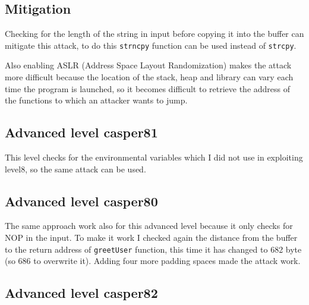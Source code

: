 \documentclass[a4paper,12pt]{article}
\begin{document}

\subsection{Mitigation}

Checking for the length of the string in input before copying it into the buffer can mitigate this attack, to do this \texttt{strncpy} function can be used instead of \texttt{strcpy}.

Also enabling ASLR (Address Space Layout Randomization) makes the attack more difficult because the location of the stack, heap and library can vary each time the program is launched, so it becomes difficult to retrieve the address of the functions to which an attacker wants to jump.

\subsection{Advanced level casper81}

This level checks for the environmental variables which I did not use in exploiting level8, so the same attack can be used.

\subsection{Advanced level casper80}

The same approach work also for this advanced level because it only checks for NOP in the input. To make it work I checked again the distance from the buffer to the return address of \texttt{greetUser} function, this time it has changed to 682 byte (so 686 to overwrite it). Adding four more padding spaces made the attack work.



\subsection{Advanced level casper82}
\end{document}
